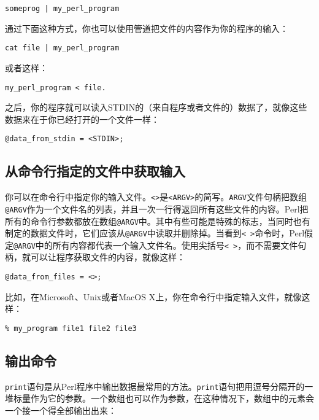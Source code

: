 \begin{lstlisting}
someprog | my_perl_program 
\end{lstlisting}

通过下面这种方式，你也可以使用管道把文件的内容作为你的程序的输入：

\begin{lstlisting}
cat file | my_perl_program 
\end{lstlisting}

或者这样：

\begin{lstlisting}
my_perl_program < file.
\end{lstlisting}

之后，你的程序就可以读入STDIN的（来自程序或者文件的）数据了，就像这些数据来在于你已经打开的一个文件一样：

\begin{lstlisting}
@data_from_stdin = <STDIN>;
\end{lstlisting}

\subsection{从命令行指定的文件中获取输入}
你可以在命令行中指定你的输入文件。\verb|<>|是\verb|<ARGV>|的简写。\verb|ARGV|文件句柄把数组\verb|@ARGV|作为一个文件名的列表，并且一次一行得返回所有这些文件的内容。Perl把所有的命令行参数都放在数组\verb|@ARGV|中。其中有些可能是特殊的标志，当同时也有制定的数据文件时，它们应该从\verb|@ARGV|中读取并删除掉。当看到\verb|< >|命令时，Perl假定\verb|@ARGV|中的所有内容都代表一个输入文件名。使用尖括号\verb|< >|，而不需要文件句柄，就可以让程序获取文件的内容，就像这样：

\begin{lstlisting}
@data_from_files = <>;
\end{lstlisting}

比如，在Microsoft、Unix或者MacOS X上，你在命令行中指定输入文件，就像这样：

\begin{lstlisting}
% my_program file1 file2 file3
\end{lstlisting}

\subsection{输出命令}
\verb|print|语句是从Perl程序中输出数据最常用的方法。\verb|print|语句把用逗号分隔开的一堆标量作为它的参数。一个数组也可以作为参数，在这种情况下，数组中的元素会一个接一个得全部输出出来：

